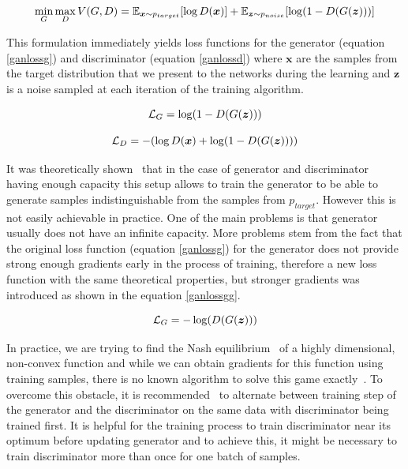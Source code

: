 \begin{equation}
\min_G \max_D V(G, D) = \operatorname{\mathbb{E}}_{\bm{x}\sim p_{target}}[\log D(\bm{x})] + \operatorname{\mathbb{E}}_{\bm{z}\sim p_{noise}} [\log(1 - D(G(\bm{z})))]
\label{gangame}
\end{equation}

This formulation immediately yields loss functions for the generator (equation \ref{ganlossg}) and discriminator (equation \ref{ganlossd}) where $\bm{x}$ are the samples from the target distribution that we present to the networks during the learning and $\bm{z}$ is a noise sampled at each iteration of the training algorithm.

\begin{equation}
\mathcal{L}_G = \log(1 - D(G(\bm{z})))
\label{ganlossg}
\end{equation}

\begin{equation}
\mathcal{L}_D = - (\log D(\bm{x}) + \log(1 - D(G(\bm{z}))))
\label{ganlossd}
\end{equation}

It was theoretically shown~\cite{origgan} that in the case of generator and discriminator having enough capacity this setup allows to train the generator to be able to generate samples indistinguishable from the samples from $p_{target}$. However this is not easily achievable in practice. One of the main problems is that generator usually does not have an infinite capacity. More problems stem from the fact that the original loss function (equation \ref{ganlossg}) for the generator does not provide strong enough gradients early in the process of training, therefore a new loss function with the same theoretical properties, but stronger gradients was introduced as shown in the equation \ref{ganlossgg}.

\begin{equation}
\mathcal{L}_G = -\log(D(G(\bm{z})))
\label{ganlossgg}
\end{equation}

In practice, we are trying to find the Nash equilibrium~\cite{nash} of a highly dimensional, non-convex function and while we can obtain gradients for this function using training samples, there is no known algorithm to solve this game exactly~\cite{improvedgan}. To overcome this obstacle, it is recommended~\cite{origgan} to alternate between training step of the generator and the discriminator on the same data with discriminator being trained first. It is helpful for the training process to train discriminator near its optimum before updating generator and to achieve this, it might be necessary to train discriminator more than once for one batch of samples.

